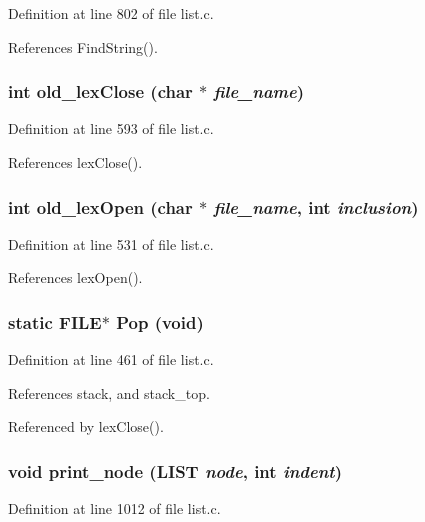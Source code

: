 Definition at line 802 of file list.c.

References Find\-String().
\subsubsection{\setlength{\rightskip}{0pt plus 5cm}int old\_\-lex\-Close (char $\ast$ {\em file\_\-name})}\label{list_8c_1221695f0862f44e98c6ba5c5e6bb749}




Definition at line 593 of file list.c.

References lex\-Close().
\subsubsection{\setlength{\rightskip}{0pt plus 5cm}int old\_\-lex\-Open (char $\ast$ {\em file\_\-name}, int {\em inclusion})}\label{list_8c_d316fdb7af85c1d1a1d01c7b1fa548f7}




Definition at line 531 of file list.c.

References lex\-Open().
\subsubsection{\setlength{\rightskip}{0pt plus 5cm}static FILE$\ast$ Pop (void)\hspace{0.3cm}{\tt  [static]}}\label{list_8c_38956204c5cb61bd81087c8b0af86c8f}




Definition at line 461 of file list.c.

References stack, and stack\_\-top.

Referenced by lex\-Close().
\subsubsection{\setlength{\rightskip}{0pt plus 5cm}void print\_\-node (\bf{LIST} {\em node}, int {\em indent})}\label{list_8c_e7f191c0df600c02d7fd68f6da542f1f}




Definition at line 1012 of file list.c.

